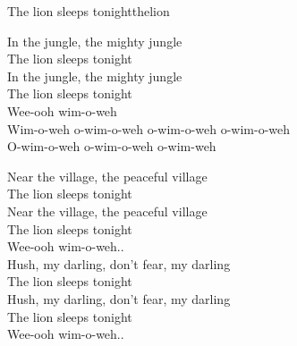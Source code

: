 \begin{song}{The lion sleeps tonight}{thelion}
\begin{vers}
In the jungle, the mighty jungle\\
The lion sleeps tonight\\
In the jungle, the mighty jungle\\
The lion sleeps tonight\\
Wee-ooh wim-o-weh\\
\repopen Wim-o-weh o-wim-o-weh o-wim-o-weh o-wim-o-weh\\
O-wim-o-weh o-wim-o-weh o-wim-weh \repclose\\
\end{vers}
\begin{vers}
Near the village, the peaceful village\\
The lion sleeps tonight\\
Near the village, the peaceful village\\
The lion sleeps tonight\\
Wee-ooh wim-o-weh..\\
Hush, my darling, don't fear, my darling\\
The lion sleeps tonight\\
Hush, my darling, don't fear, my darling\\
The lion sleeps tonight\\
Wee-ooh wim-o-weh..\\
\end{vers}
\end{song}
